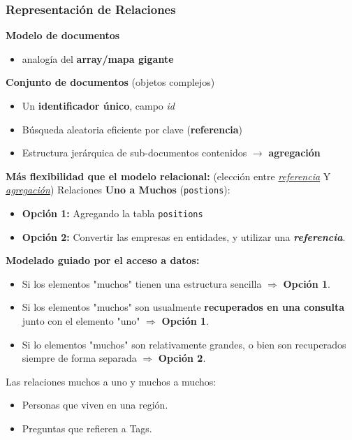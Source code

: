 \subsubsection{Representación de Relaciones}
\textbf{Modelo de documentos}
\begin{itemize}
	\item analogía del \textbf{array/mapa gigante}
\end{itemize}
\textbf{Conjunto de documentos} (objetos complejos)
\begin{itemize}
	\item Un \textbf{identificador único}, campo \textit{id}
	\item Búsqueda aleatoria eficiente por clave (\textbf{referencia})
	\item Estructura jerárquica de sub-documentos contenidos $\longrightarrow$ \textbf{agregación}
\end{itemize}
\textbf{Más flexibilidad que el modelo relacional:} (elección entre \underline{\textit{referencia}} Y \underline{\textit{agregación}})
Relaciones \textbf{Uno a Muchos} (\texttt{postions}):
\begin{itemize}
	\item \textbf{Opción 1:} Agregando la tabla \texttt{positions}
	\item \textbf{Opción 2:} Convertir las empresas en entidades, y utilizar una \textbf{\textit{referencia}}.
\end{itemize}
\textbf{Modelado guiado por el acceso a datos:}
\begin{itemize}
	\item Si los elementos "muchos" tienen una estructura sencilla $\Longrightarrow$ \textbf{Opción 1}.
	\item Si los elementos "muchos" son usualmente \textbf{recuperados en una consulta} junto con el elemento "uno" $\Longrightarrow$ \textbf{Opción 1}.
	\item Si lo elementos "muchos" son relativamente grandes, o bien son recuperados siempre de forma separada $\Longrightarrow$ \textbf{Opción 2}.
\end{itemize}
Las relaciones muchos a uno y muchos a muchos:
\begin{itemize}
	\item Personas que viven en una región.
	\item Preguntas que refieren a Tags.
\end{itemize}
